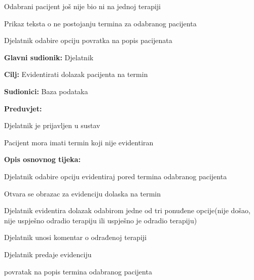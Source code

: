 \begin{packed_item}
\begin{packed_item}
						\item[3.a] Odabrani pacijent još nije bio ni na jednoj terapiji
						\item[] \begin{packed_enum}
							\item Prikaz teksta o ne postojanju termina za odabranog pacijenta
							\item Djelatnik odabire opciju povratka na popis pacijenata
											 							
						\end{packed_enum}
						
					\end{packed_item}
				\end{packed_item}
				
				\noindent {}
				\begin{packed_item}
					
					\item \textbf{Glavni sudionik: }Djelatnik
					\item  \textbf{Cilj: }Evidentirati dolazak pacijenta na termin 
					\item  \textbf{Sudionici: }Baza podataka
					\item  \textbf{Preduvjet: }
					\item[] \begin{packed_enum}
						
						\item[-] Djelatnik je prijavljen u sustav
						\item[-] Pacijent mora imati termin koji nije evidentiran
					\end{packed_enum}
					\item  \textbf{Opis osnovnog tijeka: }
					
					\item[] \begin{packed_enum}
						\item Djelatnik odabire opciju evidentiraj pored termina odabranog pacijenta
						\item Otvara se obrazac za evidenciju dolaska na termin
						\item Djelatnik evidentira dolazak odabirom jedne od tri ponuđene opcije(nije došao, nije uspješno odradio terapiju ili uspješno je odradio terapiju)
						\item Djelatnik unosi komentar o odrađenoj terapiji
						\item Djelatnik predaje evidenciju
						\item povratak na popis termina odabranog pacijenta
					\end{packed_enum}
					

\end{packed_item}
